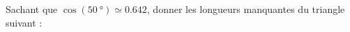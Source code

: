 
\begin{exercice}\label{exo2smath-0147}

    Sachant que \( \cos(\SI{50}{\degree})\simeq 0.642\), donner les longueurs manquantes du triangle suivant :
\begin{center}
   
\end{center}


\end{exercice}
